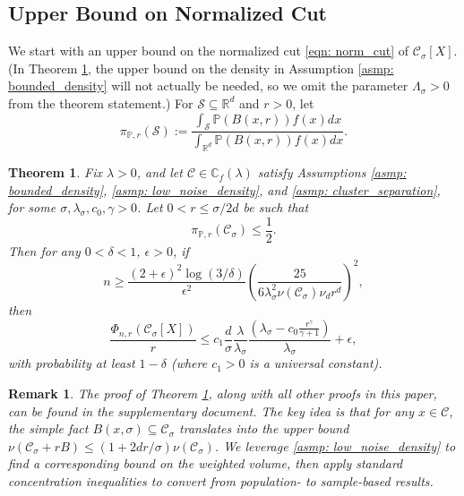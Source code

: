\documentclass{article}
\newcommand{\Reals}{\mathbb{R}}
\newcommand{\Rd}{\Reals^d}
\newcommand{\1}{\mathbf{1}}
\newcommand{\Xbf}{X}             %
\newcommand{\Pbb}{\mathbb{P}}
\newcommand{\Cbb}{\mathbb{C}}
\newcommand{\Cset}{\mathcal{C}}
\newcommand{\Csig}{\Cset_{\sigma}}
\theoremstyle{aldenthm}
\newtheorem{theorem}{Theorem}
\theoremstyle{aldenrmrk}
\newtheorem{remark}{Remark}
\begin{document}
\subsection{Upper Bound on Normalized Cut}

We start with an upper bound on the normalized cut \eqref{eqn: norm_cut} of 
$\Cset_\sigma[\Xbf]$. (In Theorem \ref{thm: conductance_upper_bound}, the upper bound on the density in
Assumption \ref{asmp: bounded_density} will not actually be needed, so we omit
the parameter $\Lambda_\sigma>0$ from the theorem statement.) For $\mathcal{S} \subseteq \Reals^d$ and $r > 0$, let
\begin{equation*}
\pi_{\Pbb,r}(\mathcal{S}) := \frac{\int_{\mathcal{S}} \Pbb(B(x,r)) f(x) dx }{\int_{\Rd} \Pbb(B(x,r)) f(x) dx}.
\end{equation*}

\begin{theorem}
\label{thm: conductance_upper_bound}
Fix $\lambda > 0$, and let $\Cset \in \Cbb_f(\lambda)$ satisfy
Assumptions \ref{asmp: bounded_density}, \ref{asmp: low_noise_density},
and \ref{asmp: cluster_separation}, for some 
$\sigma, \lambda_{\sigma}, c_0, \gamma > 0$. Let $0 < r \leq \sigma/2d$ be such that
\begin{equation}
\label{eqn: weighted_cluster_volume}
\pi_{\Pbb,r}(\Csig) \leq \frac{1}{2}.
\end{equation}
 Then for any $0 < \delta < 1$, $\epsilon > 0$, if
\begin{equation}
\label{eqn: conductance_sample_complexity}
n \geq \frac{(2+\epsilon)^2\log(3/\delta)}{\epsilon^2}\left(\frac{25}
  {6 \lambda_{\sigma}^2\nu(\Csig) \nu_d r^d}\right)^2,
\end{equation}
then
\begin{equation}
  \label{eqn: conductance_additive_error_bound}
  \frac{\Phi_{n,r}(\Csig[\Xbf])}{r} \leq c_1 \frac{d}{\sigma}
  \frac{\lambda}{\lambda_{\sigma}} \frac{(\lambda_{\sigma} -
    c_0\frac{r^{\gamma}}{\gamma+1})}{\lambda_{\sigma}} + \epsilon, 
\end{equation}
with probability at least $1-\delta$ (where $c_1 > 0$ is a universal constant).
\end{theorem}

\begin{remark}
The proof of Theorem \ref{thm: conductance_upper_bound}, along with all other
proofs in this paper, can be found in the supplementary document. The key 
idea is that for any $x \in \Cset$, the simple fact
$B(x,\sigma) \subseteq \Csig$ translates into the upper bound $\nu(\Csig + rB) \leq (1 + 2d r /\sigma)\nu(\Csig)$. We leverage \ref{asmp:
  low_noise_density} to find a corresponding bound on the weighted volume,
then apply standard concentration inequalities to convert from population-
to sample-based results.  
\end{remark}
\end{document}

